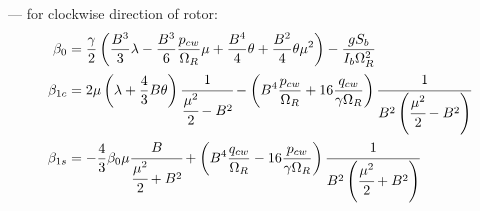 --- for clockwise direction of rotor:
\begin{align}
  \beta_0 &=
  \frac{\gamma}{2}
  \left(
      \frac{B^3}{3} \lambda 
    - \frac{B^3}{6} \frac{p_{cw}}{\Omega_R} \mu
    + \frac{B^4}{4} \theta
    + \frac{B^2}{4} \theta \mu^2
  \right) - \frac{ g S_b }{ I_b \Omega_R^2 }
  \\
  \beta_{1c} &=
  2 \mu \left( \lambda + \frac{4}{3} B \theta \right)
  \cfrac{1}{\cfrac{\mu^2}{2} - B^2}
  -
  \left(
      B^4 \frac{p_{cw}}{\Omega_R}
    + 16 \frac{q_{cw}}{\gamma \Omega_R}
  \right)
  \cfrac{1}{B^2\left(\cfrac{\mu^2}{2}-B^2\right)}
  \\
  \beta_{1s} &=
  - \frac{4}{3} \beta_0 \mu
  \cfrac{B}{\cfrac{\mu^2}{2} + B^2}
  +
  \left(
      B^4 \frac{q_{cw}}{\Omega_R} 
    - 16 \frac{p_{cw}}{\gamma \Omega_R}
  \right)
  \cfrac{1}{B^2 \left(\cfrac{\mu^2}{2}+B^2\right)}
\end{align}
